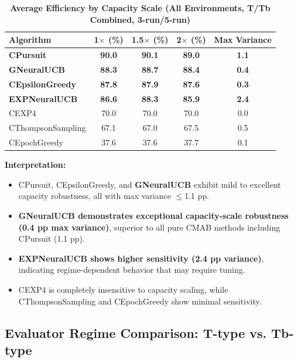 \documentclass[12pt,a4paper]{article}
\newcommand{\performance}[1]{\textcolor{performancecolor}{\textbf{#1}}}
\newcommand{\legacy}[1]{\textcolor{legacycolor}{\textbf{#1}}}
\newcommand{\neural}[1]{\textcolor{neuralcolor}{\textbf{#1}}}
\begin{document}
\begin{table}[H]
\centering
\caption{\performance{Average Efficiency by Capacity Scale (All Environments, T/Tb Combined, 3-run/5-run)}}
\begin{tabular}{|l|c|c|c|c|}
\hline
\textbf{Algorithm} & \textbf{1$\times$ (\%)} & \textbf{1.5$\times$ (\%)} & \textbf{2$\times$ (\%)} & \textbf{Max Variance} \\
\hline
\hline
\performance{CPursuit}        & \performance{90.0} & \performance{90.1} & \performance{89.0} & \performance{1.1} \\
\neural{GNeuralUCB}          & \neural{88.3} & \neural{88.7} & \neural{88.4} & \neural{0.4} \\
\performance{CEpsilonGreedy} & \performance{87.8} & \performance{87.9} & \performance{87.6} & \performance{0.3} \\
\legacy{EXPNeuralUCB}        & \legacy{86.6}     & \legacy{88.3}     & \legacy{85.9} & \legacy{2.4} \\
CEXP4                        & 70.0              & 70.0              & 70.0 & 0.0 \\
CThompsonSampling            & 67.1              & 67.0              & 67.5 & 0.5 \\
CEpochGreedy                 & 37.6              & 37.6              & 37.7 & 0.1 \\
\hline
\end{tabular}
\end{table}

\textbf{Interpretation:}
\begin{itemize}
\item CPursuit, CEpsilonGreedy, and \neural{GNeuralUCB} exhibit mild to excellent capacity robustness, all with max variance $\leq$1.1 pp.
\item \neural{GNeuralUCB demonstrates exceptional capacity-scale robustness (0.4 pp max variance)}, superior to all pure CMAB methods including CPursuit (1.1 pp).
\item \legacy{EXPNeuralUCB shows higher sensitivity (2.4 pp variance)}, indicating regime-dependent behavior that may require tuning.
\item CEXP4 is completely insensitive to capacity scaling, while CThompsonSampling and CEpochGreedy show minimal sensitivity.
\end{itemize}

\subsection{Evaluator Regime Comparison: T-type vs. Tb-type}
\end{document}
